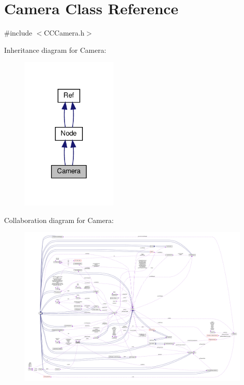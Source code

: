 \hypertarget{classCamera}{}\section{Camera Class Reference}
\label{classCamera}


{\ttfamily \#include $<$C\+C\+Camera.\+h$>$}



Inheritance diagram for Camera\+:
\nopagebreak
\begin{figure}[H]
\begin{center}
\leavevmode
\includegraphics[width=131pt]{classCamera__inherit__graph}
\end{center}
\end{figure}


Collaboration diagram for Camera\+:
\nopagebreak
\begin{figure}[H]
\begin{center}
\leavevmode
\includegraphics[width=350pt]{classCamera__coll__graph}
\end{center}
\end{figure}
